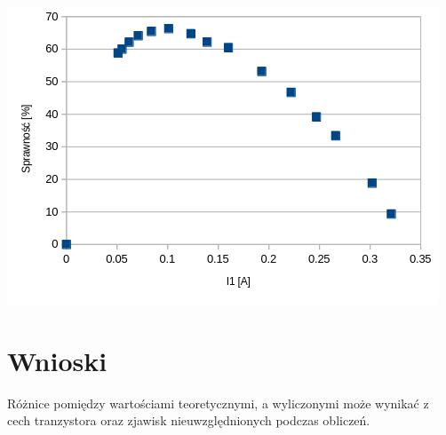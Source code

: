\documentclass[a4paper, 11pt]{article}
\begin{document}
\begin{center}
	\includegraphics[scale=0.8]{images/sprawnosc.png}
\end{center}



\section{Wnioski}\label{sub:wnioski} %
Różnice pomiędzy wartościami teoretycznymi, a wyliczonymi może wynikać z cech tranzystora oraz zjawisk nieuwzględnionych podczas obliczeń.
\end{document}
